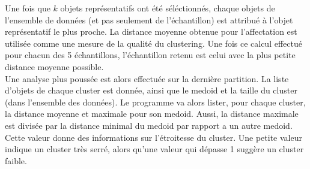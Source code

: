 \documentclass[11pt]{article}
\begin{document}
Une fois que $k$ objets représentatifs ont été séléctionnés, chaque objets de l'ensemble de données (et pas seulement de l'échantillon) est attribué à l'objet représentatif le plus proche. La distance moyenne obtenue pour l'affectation est utilisée comme une mesure de la qualité du clustering. Une fois ce calcul effectué pour chacun des 5 échantillons, l'échantillon retenu est celui avec la plus petite distance moyenne possible.\\
Une analyse plus poussée est alors effectuée sur la dernière partition. La liste d'objets de chaque cluster est donnée, ainsi que le medoid et la taille du cluster (dans l'ensemble des données). Le programme va alors lister, pour chaque cluster, la distance moyenne et maximale pour son medoid. Aussi, la distance maximale est divisée par la distance minimal du medoid par rapport a un autre medoid. Cette valeur donne des informations sur l'étroitesse du cluster. Une petite valeur indique un cluster très serré, alors qu'une valeur qui dépasse 1 suggère un cluster faible.
\end{document}
